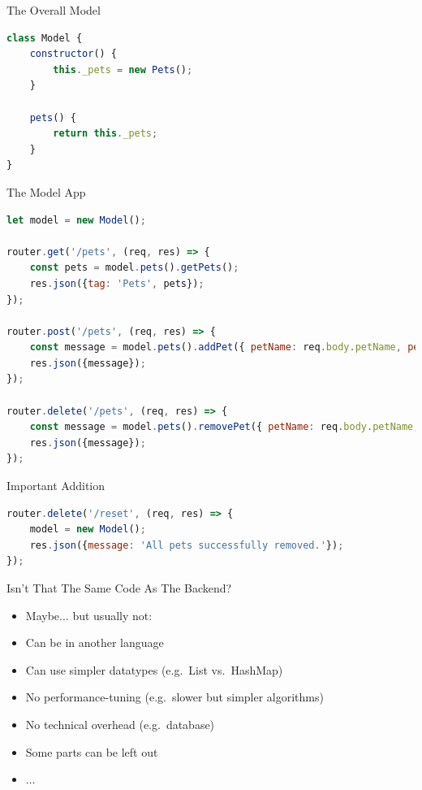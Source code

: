 \begin{frame}[fragile]{The Overall Model}

\begin{lstlisting}[language=Javascript]
class Model {
    constructor() {
        this._pets = new Pets();
    }

    pets() {
        return this._pets;
    }
}
\end{lstlisting}

\end{frame}

\begin{frame}[fragile]{The Model App}

\begin{lstlisting}[language=Javascript]
let model = new Model();

router.get('/pets', (req, res) => {
    const pets = model.pets().getPets();
    res.json({tag: 'Pets', pets});
});

router.post('/pets', (req, res) => {
    const message = model.pets().addPet({ petName: req.body.petName, petPrice: req.body.petPrice, petType: req.body.petType });
    res.json({message});
});

router.delete('/pets', (req, res) => {
    const message = model.pets().removePet({ petName: req.body.petName, petPrice: req.body.petPrice, petType: req.body.petType });
    res.json({message});
});
\end{lstlisting}

\end{frame}


\begin{frame}[fragile]{Important Addition}

\begin{lstlisting}[language=Javascript]
router.delete('/reset', (req, res) => {
    model = new Model();
    res.json({message: 'All pets successfully removed.'});
});
\end{lstlisting}

\end{frame}


\begin{frame}[fragile]{Isn't That The Same Code As The Backend?}

\begin{itemize}
\item Maybe$\ldots$ but usually not:
\item Can be in another language
\item Can use simpler datatypes (e.g.~List vs.~HashMap)
\item No performance-tuning (e.g.~slower but simpler algorithms)
\item No technical overhead (e.g.~database)
\item Some parts can be left out
\item $\ldots$
\end{itemize}

\end{frame}

